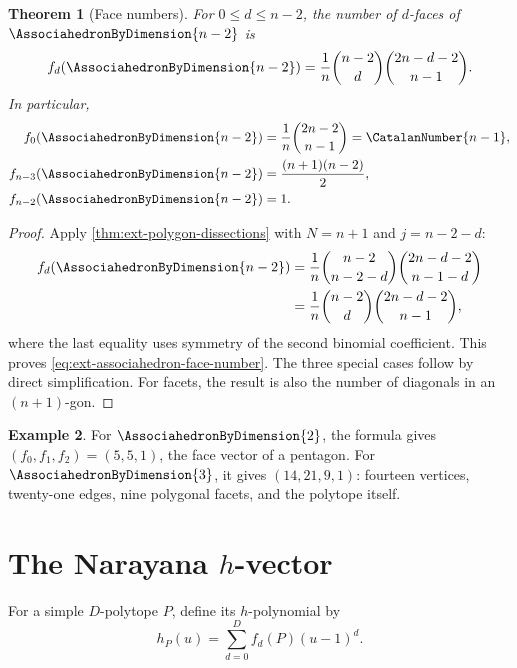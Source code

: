 \documentclass[11pt,a4paper,oneside,openany]{book}
\newtheorem{theorem}{Theorem}[chapter]
\theoremstyle{definition}
\newtheorem{example}[theorem]{Example}
\theoremstyle{remark}
\begin{document}
\begin{theorem}[Face numbers]
\label{thm:ext-associahedron-face-numbers}
For \(0\le d\le n-2\), the number of \(d\)-faces of \(\AssociahedronByDimension{n-2}\) is
\begin{equation}\label{eq:ext-associahedron-face-number}
 f_d(\AssociahedronByDimension{n-2})=\frac1n\binom{n-2}{d}
                \binom{2n-d-2}{n-1}.
\end{equation}
In particular,
\begin{align}
 f_0(\AssociahedronByDimension{n-2})&=\frac1n\binom{2n-2}{n-1}=\CatalanNumber{n-1},
 \label{eq:ext-associahedron-vertices}\\
 f_{n-3}(\AssociahedronByDimension{n-2})&=\frac{(n+1)(n-2)}2,
 \label{eq:ext-associahedron-facets}\\
 f_{n-2}(\AssociahedronByDimension{n-2})&=1.
\end{align}
\end{theorem}
\begin{proof}
Apply \cref{thm:ext-polygon-dissections} with \(N=n+1\) and
\(j=n-2-d\):
\begin{align*}
 f_d(\AssociahedronByDimension{n-2})
 &=\frac1n\binom{n-2}{n-2-d}
   \binom{2n-d-2}{n-1-d}\\
 &=\frac1n\binom{n-2}{d}\binom{2n-d-2}{n-1},
\end{align*}
where the last equality uses symmetry of the second binomial coefficient.
This proves \eqref{eq:ext-associahedron-face-number}.  The three special cases
follow by direct simplification.  For facets, the result is also the number of
diagonals in an \((n+1)\)-gon.
\end{proof}

\begin{example}
For \(\AssociahedronByDimension{2}\), the formula gives \((f_0,f_1,f_2)=(5,5,1)\), the face vector of a
pentagon.  For \(\AssociahedronByDimension{3}\), it gives \((14,21,9,1)\): fourteen vertices,
twenty-one edges, nine polygonal facets, and the polytope itself.
\end{example}

\section{The Narayana \texorpdfstring{$h$}{h}-vector}

For a simple \(D\)-polytope \(P\), define its \(h\)-polynomial by
\begin{equation}\label{eq:ext-simple-h-polynomial}
 h_P(u)=\sum_{d=0}^D f_d(P)(u-1)^d.
\end{equation}
\end{document}
